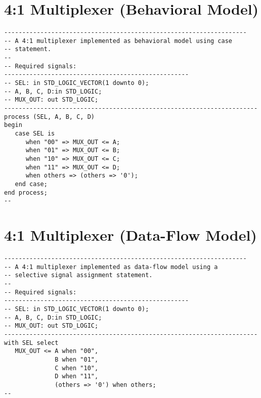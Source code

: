 \section{4:1 Multiplexer (Behavioral Model)}
\noindent
\begin{minipage}{1\linewidth}
\begin{lstlisting}
-------------------------------------------------------------------
-- A 4:1 multiplexer implemented as behavioral model using case
-- statement. 
--
-- Required signals: 
---------------------------------------------------
-- SEL: in STD_LOGIC_VECTOR(1 downto 0);
-- A, B, C, D:in STD_LOGIC;
-- MUX_OUT: out STD_LOGIC;
----------------------------------------------------------------------
process (SEL, A, B, C, D)
begin
   case SEL is
      when "00" => MUX_OUT <= A;
      when "01" => MUX_OUT <= B;
      when "10" => MUX_OUT <= C;
      when "11" => MUX_OUT <= D;
      when others => (others => '0');
   end case;
end process;
--
\end{lstlisting}
\end{minipage}

\section{4:1 Multiplexer (Data-Flow Model)}
\noindent
\begin{minipage}{1\linewidth}
\begin{lstlisting}
-------------------------------------------------------------------
-- A 4:1 multiplexer implemented as data-flow model using a
-- selective signal assignment statement. 
--
-- Required signals: 
---------------------------------------------------
-- SEL: in STD_LOGIC_VECTOR(1 downto 0);
-- A, B, C, D:in STD_LOGIC;
-- MUX_OUT: out STD_LOGIC;
----------------------------------------------------------------------
with SEL select
   MUX_OUT <= A when "00", 
              B when "01", 
              C when "10", 
              D when "11", 
              (others => '0') when others;
--
\end{lstlisting}
\end{minipage}


